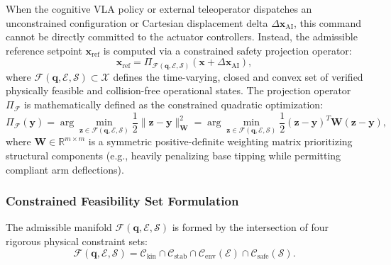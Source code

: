 When the cognitive VLA policy or external teleoperator dispatches an unconstrained configuration or Cartesian displacement delta $\Delta\mathbf{x}_{\text{AI}}$, this command cannot be directly committed to the actuator controllers. Instead, the admissible reference setpoint $\mathbf{x}_{\text{ref}}$ is computed via a constrained safety projection operator:
\begin{equation}
  \mathbf{x}_{\text{ref}} = \Pi_{\mathcal{F}(\mathbf{q}, \mathcal{E}, \mathcal{S})}\left(\mathbf{x} + \Delta\mathbf{x}_{\text{AI}}\right),
  \label{eq:safety_projection}
\end{equation}
where $\mathcal{F}(\mathbf{q}, \mathcal{E}, \mathcal{S}) \subset \mathcal{X}$ defines the time-varying, closed and convex set of verified physically feasible and collision-free operational states. The projection operator $\Pi_{\mathcal{F}}$ is mathematically defined as the constrained quadratic optimization:
\begin{equation}
  \Pi_{\mathcal{F}}(\mathbf{y}) = \arg\min_{\mathbf{z} \in \mathcal{F}(\mathbf{q}, \mathcal{E}, \mathcal{S})} \frac{1}{2} \|\mathbf{z} - \mathbf{y}\|_{\mathbf{W}}^2 = \arg\min_{\mathbf{z} \in \mathcal{F}(\mathbf{q}, \mathcal{E}, \mathcal{S})} \frac{1}{2} (\mathbf{z} - \mathbf{y})^T \mathbf{W} (\mathbf{z} - \mathbf{y}),
  \label{eq:projection_optimization}
\end{equation}
where $\mathbf{W} \in \mathbb{R}^{m \times m}$ is a symmetric positive-definite weighting matrix prioritizing structural components (e.g., heavily penalizing base tipping while permitting compliant arm deflections).

\subsubsection{Constrained Feasibility Set Formulation}
The admissible manifold $\mathcal{F}(\mathbf{q}, \mathcal{E}, \mathcal{S})$ is formed by the intersection of four rigorous physical constraint sets:
\begin{equation}
  \mathcal{F}(\mathbf{q}, \mathcal{E}, \mathcal{S}) = \mathcal{C}_{\text{kin}} \cap \mathcal{C}_{\text{stab}} \cap \mathcal{C}_{\text{env}}(\mathcal{E}) \cap \mathcal{C}_{\text{safe}}(\mathcal{S}).
  \label{eq:feasibility_intersection}
\end{equation}


